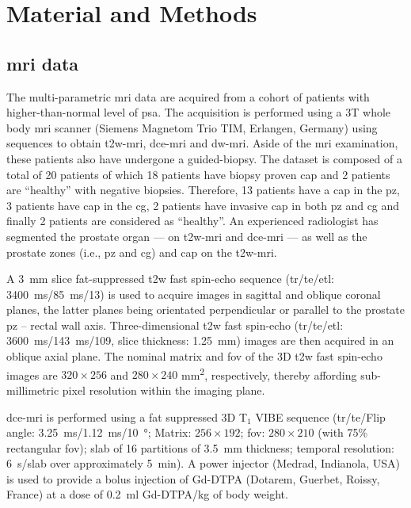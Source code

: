 \section{Material and Methods}\label{sec:method}

\subsection{\ac{mri} data}\label{sec:data}

The multi-parametric \ac{mri} data are acquired from a cohort of patients with higher-than-normal level of \ac{psa}.
The acquisition is performed using a 3T whole body \ac{mri} scanner (Siemens Magnetom Trio TIM, Erlangen, Germany) using sequences to obtain \ac{t2w}-\ac{mri}, \ac{dce}-\ac{mri} and \ac{dw}-\ac{mri}.
Aside of the \ac{mri} examination, these patients also have undergone a guided-biopsy.
The dataset is composed of a total of 20 patients of which 18 patients have biopsy proven \ac{cap} and 2 patients are ``healthy'' with negative biopsies.
Therefore, 13 patients have a \ac{cap} in the \ac{pz}, 3 patients have \ac{cap} in the \ac{cg}, 2 patients have invasive \ac{cap} in both \ac{pz} and \ac{cg} and finally 2 patients are considered as ``healthy''.
An experienced radiologist has segmented the prostate organ --- on \ac{t2w}-\ac{mri} and \ac{dce}-\ac{mri} --- as well as the prostate zones (i.e., \ac{pz} and \ac{cg}) and \ac{cap} on the \ac{t2w}-\ac{mri}.

A \SI{3}{\mm} slice fat-suppressed \ac{t2w} fast spin-echo sequence (\ac{tr}/\ac{te}/\ac{etl}: \SI{3400}{\ms}/\SI{85}{\ms}/13) is used to acquire images in sagittal and oblique coronal planes, the latter planes being orientated perpendicular or parallel to the prostate \ac{pz} – rectal wall axis.
Three-dimensional \ac{t2w} fast spin-echo (\ac{tr}/\ac{te}/\ac{etl}: \SI{3600}{\ms}/\SI{143}{\ms}/109, slice thickness: \SI{1.25}{\mm}) images are then acquired in an oblique axial plane.
The nominal matrix and \ac{fov} of the 3D \ac{t2w} fast spin-echo images are $320 \times 256$ and $280 \times 240$ mm\textsuperscript{2}, respectively, thereby affording sub-millimetric pixel resolution within the imaging plane.

\ac{dce}-\ac{mri} is performed using a fat suppressed 3D T$_1$ VIBE sequence (\ac{tr}/\ac{te}/Flip angle: \SI{3.25}{\ms}/\SI{1.12}{\ms}/\SI{10}{\degree}; Matrix: $256 \times 192$; \ac{fov}: $280 \times 210$ (with 75\% rectangular \ac{fov}); slab of 16 partitions of \SI{3.5}{\mm} thickness; temporal resolution: \SI{6}{\s}/slab over approximately \SI{5}{\minute}).
A power injector (Medrad, Indianola, USA) is used to provide a bolus injection of Gd-DTPA (Dotarem, Guerbet, Roissy, France) at a dose of \SI{0.2}{\ml} Gd-DTPA/kg of body weight.

